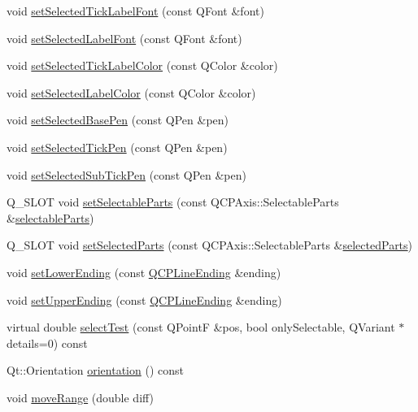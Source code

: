 \begin{DoxyCompactItemize}
\item 
void \hyperlink{classQCPAxis_a845ccb560b7bc5281098a5be494145f6}{set\+Selected\+Tick\+Label\+Font} (const Q\+Font \&font)
\item 
void \hyperlink{classQCPAxis_a02ec2a75d4d8401eaab834fbc6803d30}{set\+Selected\+Label\+Font} (const Q\+Font \&font)
\item 
void \hyperlink{classQCPAxis_a9bdbf5e63ab15187f3a1de9440129227}{set\+Selected\+Tick\+Label\+Color} (const Q\+Color \&color)
\item 
void \hyperlink{classQCPAxis_a5d502dec597c634f491fdd73d151c72d}{set\+Selected\+Label\+Color} (const Q\+Color \&color)
\item 
void \hyperlink{classQCPAxis_aeb917a909215605b95ef2be843de1ee8}{set\+Selected\+Base\+Pen} (const Q\+Pen \&pen)
\item 
void \hyperlink{classQCPAxis_a8360502685eb782edbf04019c9345cdc}{set\+Selected\+Tick\+Pen} (const Q\+Pen \&pen)
\item 
void \hyperlink{classQCPAxis_a2a00a7166600155eac26843132eb9576}{set\+Selected\+Sub\+Tick\+Pen} (const Q\+Pen \&pen)
\item 
Q\+\_\+\+S\+L\+OT void \hyperlink{classQCPAxis_a513f9b9e326c505d9bec54880031b085}{set\+Selectable\+Parts} (const Q\+C\+P\+Axis\+::\+Selectable\+Parts \&\hyperlink{classQCPAxis_ad2bff3d2ed3d35c10d44c0c02441bd2c}{selectable\+Parts})
\item 
Q\+\_\+\+S\+L\+OT void \hyperlink{classQCPAxis_ab9d7a69277dcbed9119b3c1f25ca19c3}{set\+Selected\+Parts} (const Q\+C\+P\+Axis\+::\+Selectable\+Parts \&\hyperlink{classQCPAxis_a08323248a1cba4750ef07ceea159e0b3}{selected\+Parts})
\item 
void \hyperlink{classQCPAxis_a08af1c72db9ae4dc8cb8a973d44405ab}{set\+Lower\+Ending} (const \hyperlink{classQCPLineEnding}{Q\+C\+P\+Line\+Ending} \&ending)
\item 
void \hyperlink{classQCPAxis_a69119b892fc306f651763596685aa377}{set\+Upper\+Ending} (const \hyperlink{classQCPLineEnding}{Q\+C\+P\+Line\+Ending} \&ending)
\item 
virtual double \hyperlink{classQCPAxis_a2877a6230920c118be65c6113089f467}{select\+Test} (const Q\+PointF \&pos, bool only\+Selectable, Q\+Variant $\ast$details=0) const 
\item 
Qt\+::\+Orientation \hyperlink{classQCPAxis_a57483f2f60145ddc9e63f3af53959265}{orientation} () const 
\item 
void \hyperlink{classQCPAxis_a18f3a68f2b691af1fd34b6593c886630}{move\+Range} (double diff)

\end{DoxyCompactItemize}
